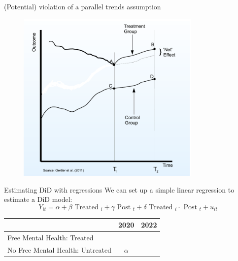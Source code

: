 \documentclass[11pt]{beamer}
\begin{document}
\begin{frame}{(Potential) violation of a parallel trends assumption}

\begin{figure}
\includegraphics[width=0.8\textwidth]{figures/did2.png}
\end{figure}

\end{frame}




\begin{frame}{Estimating DiD with regressions}
We can set up a simple linear regression to estimate a  DiD model:
$$
Y_{i t}=\alpha+\beta \text { Treated }_i+\gamma \text { Post }_t+\delta \text { Treated }_i \cdot \text { Post }_t+u_{i t}
$$


\begin{table}[]
\begin{tabular}{lcc}
\toprule
\textbf{}                        & \textbf{2020} & \textbf{2022} \\ \midrule
Free Mental Health: Treated      &        &          \\ \midrule
No Free Mental Health: Untreated &    $\alpha$       &         \\ \bottomrule
\end{tabular}
\end{table}


\end{frame}
\end{document}
